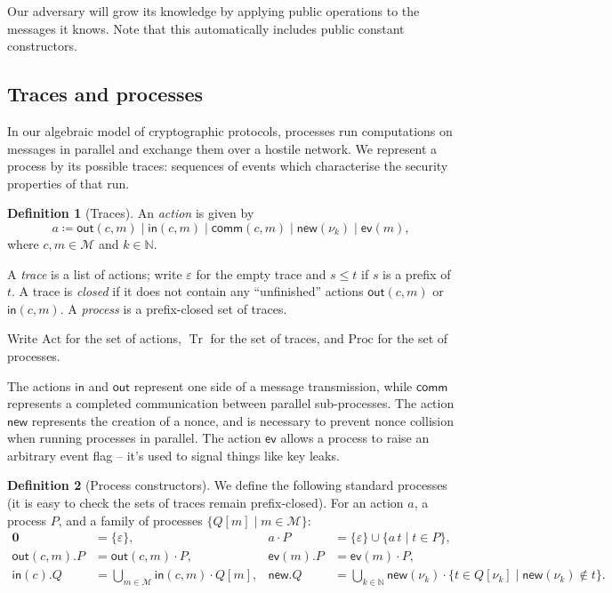 \documentclass[11pt]{article}
\theoremstyle{definition}
\newtheorem{definition}{Definition}[section]
\theoremstyle{plain}
\theoremstyle{remark}
\newcommand{\N}{\mathbb{N}}
\newcommand{\Act}{\mathrm{Act}}
\newcommand{\Proc}{\mathrm{Proc}}
\newcommand{\Tr}{\operatorname{Tr}}
\begin{document}
Our adversary will grow its knowledge by applying public operations to the messages it knows. Note that this automatically includes public constant constructors.

\subsection{Traces and processes}

In our algebraic model of cryptographic protocols, processes run computations on messages in parallel and exchange them over a hostile network. We represent a process by its possible traces: sequences of events which characterise the security properties of that run.

\begin{definition}[Traces]
An \textit{action} is given by
\[
a\coloneqq\mathsf{out}(c,m)\mid\mathsf{in}(c,m)\mid\mathsf{comm}(c,m)\mid\mathsf{new}(\nu_k)\mid\mathsf{ev}(m),
\]
where $c,m\in\mathcal{M}$ and $k\in\N$.

A \textit{trace} is a list of actions; write $\varepsilon$ for the empty trace and $s\le t$ if $s$ is a prefix of $t$. A trace is \textit{closed} if it does not contain any ``unfinished'' actions $\mathsf{out}(c,m)$ or $\mathsf{in}(c,m)$. A \textit{process} is a prefix-closed set of traces.
\end{definition}

Write $\Act$ for the set of actions, $\Tr$ for the set of traces, and $\Proc$ for the set of processes.

The actions $\mathsf{in}$ and $\mathsf{out}$ represent one side of a message transmission, while $\mathsf{comm}$ represents a completed communication between parallel sub-processes. The action $\mathsf{new}$ represents the creation of a nonce, and is necessary to prevent nonce collision when running processes in parallel. The action $\mathsf{ev}$ allows a process to raise an arbitrary event flag -- it's used to signal things like key leaks.

\begin{definition}[Process constructors]\label{def:seq}
We define the following standard processes (it is easy to check the sets of traces remain prefix-closed). For an action $a$, a process $P$, and a family of processes $\{Q[m]\mid m\in\mathcal{M}\}$:
\begin{align*}
\mathbf{0} &= \{\varepsilon\}, &
a\cdot P &= \{\varepsilon\}\cup\{a\,t\mid t\in P\},\\
\mathsf{out}(c,m).P &= \mathsf{out}(c,m)\cdot P, &
\mathsf{ev}(m).P &= \mathsf{ev}(m)\cdot P,\\
\mathsf{in}(c).Q &= \textstyle\bigcup_{m\in\mathcal{M}}\mathsf{in}(c,m)\cdot Q[m], &
\mathsf{new}.Q &= \textstyle\bigcup_{k\in\N}\mathsf{new}(\nu_k)\cdot\{t\in Q[\nu_k]\mid\mathsf{new}(\nu_k)\notin t\}.
\end{align*}
\end{definition}
\end{document}
